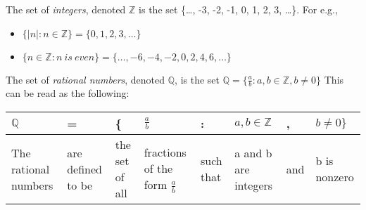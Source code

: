 \documentclass{amsart} %
\theoremstyle{definition} %
\theoremstyle{definition}
\theoremstyle{remark} %
\begin{document}
\medskip
\noindent {} \quad The set of \emph{integers}, denoted $\mathbb{Z}$ is the set \{\dots, -3, -2, -1, 0, 1, 2, 3, \dots \}. For e.g.,
    \begin{itemize}
          \item $\{|n|:n \in \mathbb{Z} \} = \{0, 1, 2, 3, \dots\}$
          \item $\{n \in \mathbb{Z}: n\ is\ even\} = \{\dots, -6, -4, -2, 0, 2, 4, 6, \dots \}$ %
    \end{itemize}

\medskip
\noindent {} \quad The set of \emph{rational numbers}, denoted $\mathbb{Q}$, is the set $\mathbb{Q} = \{\frac{a}{b}: a,b \in \mathbb{Z}, b \neq 0 \}$
This can be read as the following:
    \begin{center}
    \begin{tabularx}{0.95\textwidth}{ %
      | >{\centering\arraybackslash}X %
      | >{\centering\arraybackslash}X
      | >{\centering\arraybackslash}X
      | >{\centering\arraybackslash}X
      | >{\centering\arraybackslash}X
      | >{\centering\arraybackslash}X
      | >{\centering\arraybackslash}X
      | >{\centering\arraybackslash}X | }
      $\mathbb{Q}$ & = & \{ & $\frac{a}{b}$ & : & $a,b \in \mathbb{Z}$ & , & $b \neq 0\}$ \\
      \hline
      The rational numbers & are defined to be & the set of all & fractions of the form $\frac{a}{b}$ & such that & a and b are integers & and & b is nonzero \\
    \end{tabularx}
    \end{center}

\end{document}
